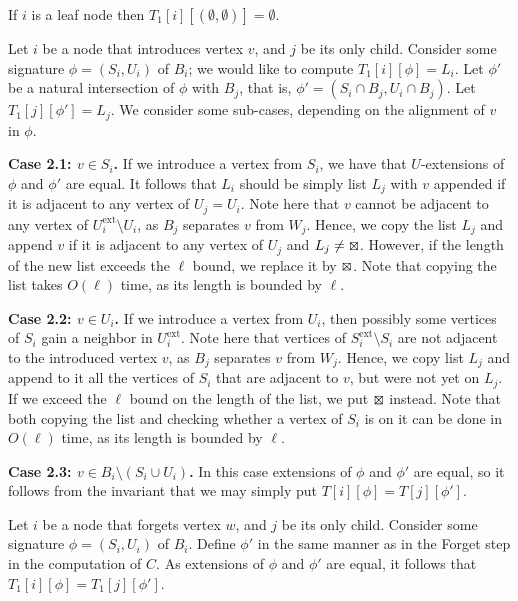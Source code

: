\documentclass[a4paper,11pt]{article}
\theoremstyle{definition}
\theoremstyle{remark}
\newcommand{\ext}{\textrm{ext}}
\begin{document}
\vskip 0.3cm
 If $i$ is a leaf node then
$T_1[i][(\emptyset,\emptyset)]=\emptyset$.  \vskip 0.3cm

 Let $i$ be a node that
introduces vertex $v$, and $j$ be its only child.  Consider some
signature $\phi=(S_i,U_i)$ of $B_i$; we would like to compute
$T_1[i][\phi]=L_i$.  Let $\phi'$ be a natural intersection of $\phi$
with $B_j$, that is, $\phi'=(S_i\cap B_j, U_i\cap B_j)$.  Let
$T_1[j][\phi']=L_j$.  We consider some sub-cases, depending on the
alignment of $v$ in $\phi$.

\vskip 0.1cm {\bf{Case 2.1: $v\in S_i$.}} If we introduce a vertex from
$S_i$, we have that $U$-extensions of $\phi$ and $\phi'$ are equal.
It follows that $L_i$ should be simply list $L_j$ with $v$ appended if
it is adjacent to any vertex of $U_j=U_i$.  Note here that $v$ cannot
be adjacent to any vertex of $U^{\ext}_i\setminus U_i$, as $B_j$
separates $v$ from $W_j$.  Hence, we copy the list $L_j$ and append
$v$ if it is adjacent to any vertex of $U_j$ and $L_j\neq \tldr$.
However, if the length of the new list exceeds the $\ell$ bound, we
replace it by $\tldr$.  Note that copying the list takes $O(\ell)$
time, as its length is bounded by $\ell$.

\vskip 0.1cm {\bf{Case 2.2: $v\in U_i$.}} If we introduce a vertex from
$U_i$, then possibly some vertices of $S_i$ gain a neighbor in
$U^{\ext}_i$.  Note here that vertices of $S^{\ext}_i\setminus S_i$
are not adjacent to the introduced vertex $v$, as $B_j$ separates $v$
from $W_j$.  Hence, we copy list $L_j$ and append to it all the
vertices of $S_i$ that are adjacent to $v$, but were not yet on $L_j$.
If we exceed the $\ell$ bound on the length of the list, we put
$\tldr$ instead.  Note that both copying the list and checking whether
a vertex of $S_i$ is on it can be done in $O(\ell)$ time, as its
length is bounded by $\ell$.

\vskip 0.1cm

{\bf{Case 2.3: $v\in B_i\setminus (S_i\cup U_i)$.}} In this case extensions of $\phi$
and $\phi'$ are equal, so it follows from the invariant that we may
simply put $T[i][\phi]=T[j][\phi']$.

\vskip 0.3cm

 Let $i$ be a node that forgets
vertex $w$, and $j$ be its only child.  Consider some signature
$\phi=(S_i,U_i)$ of $B_i$.  Define $\phi'$ in the same manner as in
the Forget step in the computation of $C$.  As extensions of $\phi$
and $\phi'$ are equal, it follows that $T_1[i][\phi]=T_1[j][\phi']$.
\end{document}
